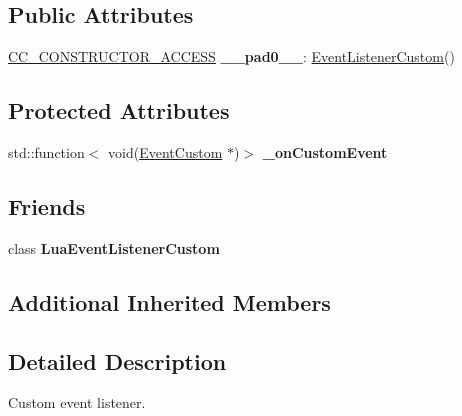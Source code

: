 \subsection*{Public Attributes}
\begin{DoxyCompactItemize}
\item 
\mbox{\label{classEventListenerCustom_a93094ae85514d09ccd56de27799e624a}} 
\hyperlink{_2cocos2d_2cocos_2base_2ccConfig_8h_a25ef1314f97c35a2ed3d029b0ead6da0}{C\+C\+\_\+\+C\+O\+N\+S\+T\+R\+U\+C\+T\+O\+R\+\_\+\+A\+C\+C\+E\+SS} {\bfseries \+\_\+\+\_\+pad0\+\_\+\+\_\+}\+: \hyperlink{classEventListenerCustom}{Event\+Listener\+Custom}()
\end{DoxyCompactItemize}
\subsection*{Protected Attributes}
\begin{DoxyCompactItemize}
\item 
\mbox{\label{classEventListenerCustom_ac5272b93cdde1f2229d3ed199ecc9987}} 
std\+::function$<$ void(\hyperlink{classEventCustom}{Event\+Custom} $\ast$)$>$ {\bfseries \+\_\+on\+Custom\+Event}
\end{DoxyCompactItemize}
\subsection*{Friends}
\begin{DoxyCompactItemize}
\item 
\mbox{\label{classEventListenerCustom_af98b1f4e76381b33c14a5fe57bd230f9}} 
class {\bfseries Lua\+Event\+Listener\+Custom}
\end{DoxyCompactItemize}
\subsection*{Additional Inherited Members}


\subsection{Detailed Description}
Custom event listener. 


